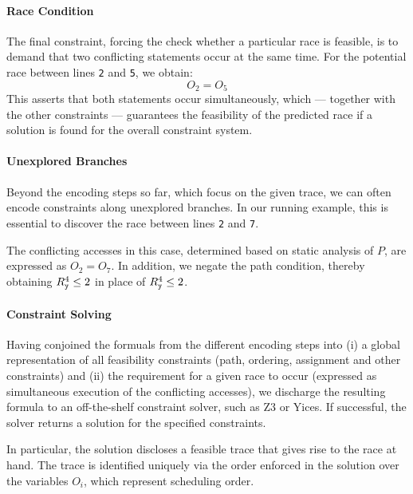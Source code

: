 \paragraph{Race Condition} The final constraint, forcing the check whether a particular race is feasible, is to demand that two conflicting statements occur at the same time. For the potential race between lines {\tt 2} and {\tt 5}, we obtain:
$$
	O_2 = O_5
$$ 
This asserts that both statements occur simultaneously, which --- together with the other constraints --- guarantees the feasibility of the predicted race if a solution is found for the overall constraint system.

\paragraph{Unexplored Branches} Beyond the encoding steps so far, which focus on the given trace, we can often encode constraints along unexplored branches. In our running example, this is essential to discover the race between lines {\tt 2} and {\tt 7}. 

The conflicting accesses in this case, determined based on static analysis of $P$, are expressed as $O_2=O_7$. In addition, we negate the path condition, thereby obtaining $R_{\tt y}^4 \leq 2$ in place of $R_{\tt y}^4 \leq 2$. 

\paragraph{Constraint Solving} Having conjoined the formuals from the different encoding steps into (i) a global representation of all feasibility constraints (path, ordering, assignment and other constraints) and (ii) the requirement for a given race to occur (expressed as simultaneous execution of the conflicting accesses), we discharge the resulting formula to an off-the-shelf constraint solver, such as Z3 or Yices. If successful, the solver returns a solution for the specified constraints. 

In particular, the solution discloses a feasible trace that gives rise to the race at hand. The trace is identified uniquely via the order enforced in the solution over the variables $O_i$, which represent scheduling order. 
